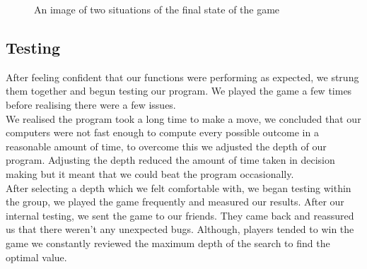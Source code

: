\documentclass[10pt]{article}
\begin{document}
\begin{figure}%
    \centering
    \qquad
    \caption{An image of two situations of the final state of the game}%
\end{figure}


\subsection{Testing}
After feeling confident that our functions were performing as expected, we strung them together and begun testing our program. We played the game a few times before realising there were a few issues.
\\We realised the program took a long time to make a move, we concluded that our computers were not fast enough to compute every possible outcome in a reasonable amount of time, to overcome this we adjusted the depth of our program. Adjusting the depth reduced the amount of time taken in decision making but it meant that we could beat the program occasionally. 
\\After selecting a depth which we felt comfortable with, we began testing within the group, we played the game frequently and measured our results. After our internal testing, we sent the game to our friends. They came back and reassured us that there weren't any unexpected bugs. Although, players tended to win the game we constantly reviewed the maximum depth of the search to find the optimal value.
\end{document}
